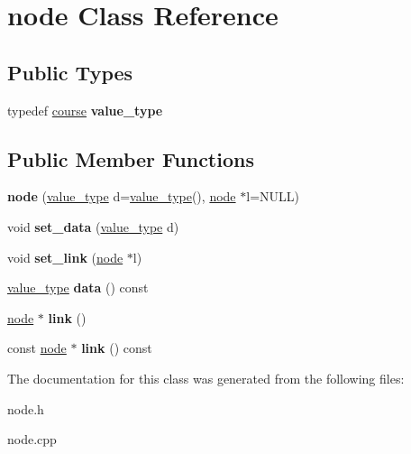 \hypertarget{classnode}{}\section{node Class Reference}
\label{classnode}
\subsection*{Public Types}
\begin{DoxyCompactItemize}
\item 
\mbox{\label{classnode_af79958a8234d1a3d642adf6637cb9f9b}} 
typedef \hyperlink{classcourse}{course} {\bfseries value\+\_\+type}
\end{DoxyCompactItemize}
\subsection*{Public Member Functions}
\begin{DoxyCompactItemize}
\item 
\mbox{\label{classnode_a4d89d50fbee6842a2588ef0c07063cb8}} 
{\bfseries node} (\hyperlink{classcourse}{value\+\_\+type} d=\hyperlink{classcourse}{value\+\_\+type}(), \hyperlink{classnode}{node} $\ast$l=N\+U\+LL)
\item 
\mbox{\label{classnode_ac9906af97ebcd35ffa46145f865eed6c}} 
void {\bfseries set\+\_\+data} (\hyperlink{classcourse}{value\+\_\+type} d)
\item 
\mbox{\label{classnode_ae9887204ac73c954e3a4da3fa15c9df9}} 
void {\bfseries set\+\_\+link} (\hyperlink{classnode}{node} $\ast$l)
\item 
\mbox{\label{classnode_aa608d1caf66b840edfa523ee7825c995}} 
\hyperlink{classcourse}{value\+\_\+type} {\bfseries data} () const
\item 
\mbox{\label{classnode_a3871737751cf0fd295a07c77d0c72f82}} 
\hyperlink{classnode}{node} $\ast$ {\bfseries link} ()
\item 
\mbox{\label{classnode_a1cdde999247cd38cf9dc9ee8fc91f5f7}} 
const \hyperlink{classnode}{node} $\ast$ {\bfseries link} () const
\end{DoxyCompactItemize}


The documentation for this class was generated from the following files\+:\begin{DoxyCompactItemize}
\item 
node.\+h\item 
node.\+cpp\end{DoxyCompactItemize}

